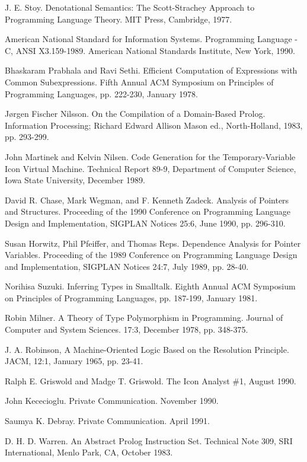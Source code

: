 \noindent
[Stoy] J. E. Stoy. Denotational Semantics: The Scott-Strachey Approach
to Programming Language Theory. MIT Press, Cambridge, 1977.

\noindent
[ansi-c] American National Standard for Information
Systems. Programming Language - C, ANSI X3.159-1989. American National
Standards Institute, New York, 1990.

\noindent
[Prabhala] Bhaskaram Prabhala and Ravi Sethi. Efficient Computation of
Expressions with Common Subexpressions. Fifth Annual ACM Symposium on
Principles of Programming Languages, pp. 222-230, January 1978.

\noindent
[Nilsson] J{\o}rgen Fischer Nilsson. On the Compilation of a
Domain-Based Prolog. Information Processing; Richard Edward Allison
Mason ed., North-Holland, 1983, pp. 293-299.

\noindent
[Martinek] John Martinek and Kelvin Nilsen. Code Generation for the
Temporary-Variable Icon Virtual Machine. Technical Report 89-9,
Department of Computer Science, Iowa State University, December 1989.

\noindent
[pntstr] David R. Chase, Mark Wegman, and F. Kenneth Zadeck. Analysis
of Pointers and Structures. Proceeding of the 1990 Conference on
Programming Language Design and Implementation, SIGPLAN Notices 25:6,
June 1990, pp. 296-310.

\noindent
[depptr] Susan Horwitz, Phil Pfeiffer, and Thomas Reps. Dependence
Analysis for Pointer Variables. Proceeding of the 1989 Conference on
Programming Language Design and Implementation, SIGPLAN Notices 24:7,
July 1989, pp. 28-40.

 Norihisa Suzuki. Inferring Types in Smalltalk. Eighth
Annual ACM Symposium on Principles of Programming Languages,
pp. 187-199, January 1981.

\noindent
[Milner] Robin Milner. A Theory of Type Polymorphism in
Programming. Journal of Computer and System Sciences. 17:3, December
1978, pp. 348-375.

\noindent
[unify] J. A. Robinson, A Machine-Oriented Logic Based on the
Resolution Principle. JACM, 12:1, January 1965, pp.  23-41.

\noindent
[ianl1] Ralph E. Griswold and Madge T. Griswold. The Icon Analyst \#1,
August 1990.

\noindent
[johnk] John Kececioglu. Private Communication. November 1990.

 Saumya K. Debray. Private Communication. April 1991.

\noindent
[wam] D. H. D. Warren. An Abstract Prolog Instruction Set. Technical
Note 309, SRI International, Menlo Park, CA, October 1983.
